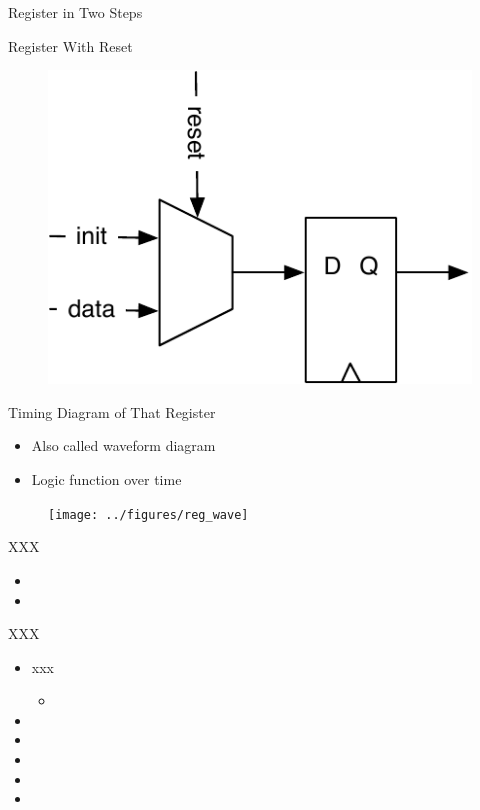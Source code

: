 \documentclass[xcolor=pdflatex,dvipsnames,table]{beamer}
\newcommand{\scale}{0.7}
\begin{document}
\begin{frame}[fragile]{Register in Two Steps}
\end{frame}

\begin{frame}[fragile]{Register With Reset}
\begin{figure}
  \includegraphics[scale=\scale]{../figures/register-reset}
\end{figure}
\end{frame}

\begin{frame}[fragile]{Timing Diagram of That Register}
\begin{itemize}
\item Also called waveform diagram
\item Logic function over time
\end{itemize}
\begin{figure}
  \texttt{[image: ../figures/reg\_wave]}
\end{figure}
\end{frame}


\begin{frame}[fragile]{XXX}
\begin{itemize}
\item
\item
\end{itemize}
\end{frame}


\begin{frame}[fragile]{XXX}
\begin{itemize}
\item xxx
\begin{itemize}
\item
\end{itemize}
\item
\item
\item
\item
\item
\end{itemize}
\end{frame}
\end{document}
